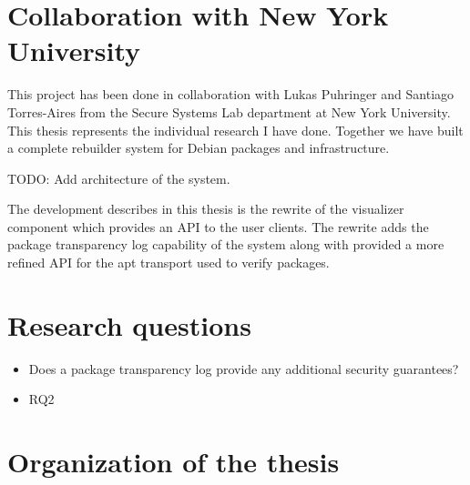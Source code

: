 \documentclass[../Main/thesis.tex]{subfiles}
\begin{document}
\section{Collaboration with New York University}\label{sec:collab}
This project has been done in collaboration with Lukas Puhringer and Santiago
Torres-Aires from the Secure Systems Lab department at New York University. This
thesis represents the individual research I have done. Together we have built a
complete rebuilder system for Debian packages and infrastructure. 

TODO: Add architecture of the system.

The development describes in this thesis is the rewrite of the visualizer
component which provides an API to the user clients. The rewrite adds the
package transparency log capability of the system along with provided a more
refined API for the apt transport used to verify packages.

\section{Research questions}\label{sec:rq}
\begin{itemize}
    \item Does a package transparency log provide any additional security guarantees?
    \item RQ2
\end{itemize}

\section{Organization of the thesis}\label{sec:organization}

\blankpage
\end{document}
